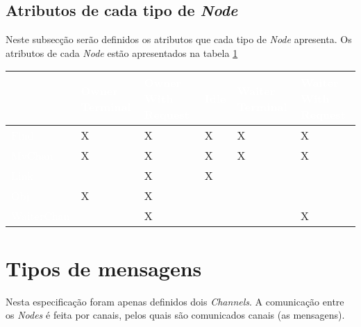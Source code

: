 \subsection*{Atributos de cada tipo de \emph{Node}}
Neste subsecção serão definidos os atributos que cada tipo de \emph{Node} apresenta.
Os atributos de cada \emph{Node} estão apresentados na tabela \ref{especificacao:tbl:atributos}


\begin{table}
\label{especificacao:tbl:atributos}
\centering
\begin{tabular}{|l|l|l|l|l|l|} 
\hline
\rowcolor{black}                                 & \textcolor{white}{Owner Terminal} & \textcolor{white}{Owner With Request} & \textcolor{white}{Idle} & \textcolor{white}{Waiter Terminal} & \textcolor{white}{Waiter With Request}  \\ 
\hline
{\cellcolor{black}}\textcolor{white}{Find}       & X                                & X                                    & X                      & X                                 & X                                      \\ 
\hline
{\cellcolor{black}}\textcolor{white}{MyChan}     & X                                & X                                    & X                      & X                                 & X                                      \\ 
\hline
{\cellcolor{black}}\textcolor{white}{Link}       &                                   & X                                    & X                      &                                    &                                         \\ 
\hline
{\cellcolor{black}}\textcolor{white}{Obj}        & X                                & X                                    &                         &                                    &                                         \\ 
\hline
{\cellcolor{black}}\textcolor{white}{WaiterChan} &                                   & X                                    &                         &                                    & X                                      \\
\hline
\end{tabular}
\end{table}

\section{Tipos de mensagens}
\label{especificacao:sec:tipos_mensagem}
Nesta especificação foram apenas definidos dois \emph{Channels}. A comunicação entre os \emph{Nodes} é feita por canais, pelos quais são comunicados canais (as mensagens).



